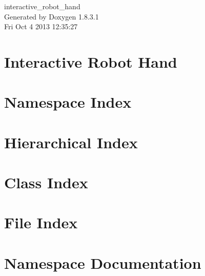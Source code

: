 \documentclass{book}
\begin{document}
\begin{titlepage}
\vspace*{7cm}
\begin{center}
{\Large interactive\-\_\-robot\-\_\-hand }\\
\vspace*{1cm}
{\large Generated by Doxygen 1.8.3.1}\\
\vspace*{0.5cm}
{\small Fri Oct 4 2013 12:35:27}\\
\end{center}
\end{titlepage}
\clearemptydoublepage
{}
\tableofcontents
\clearemptydoublepage
{}
\chapter{Interactive Robot Hand}
\label{index}
\chapter{Namespace Index}

\chapter{Hierarchical Index}

\chapter{Class Index}

\chapter{File Index}

\chapter{Namespace Documentation}







\end{document}
